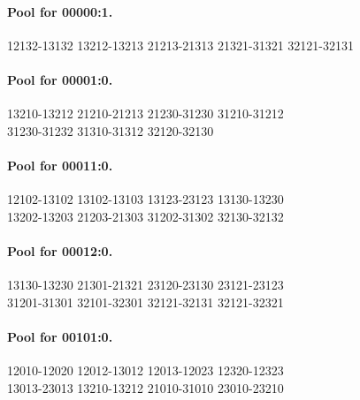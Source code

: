 \documentclass[11pt]{article}
\theoremstyle{remark}
\numberwithin{equation}{section}
\numberwithin{table}{section}
\begin{document}
\paragraph{Pool for 00000:1.}
\begingroup\footnotesize\ttfamily\begin{flushleft}
12132-13132 13212-13213 21213-21313 21321-31321 32121-32131\\
\end{flushleft}\endgroup
\paragraph{Pool for 00001:0.}
\begingroup\footnotesize\ttfamily\begin{flushleft}
13210-13212 21210-21213 21230-31230 31210-31212\\
31230-31232 31310-31312 32120-32130\\
\end{flushleft}\endgroup
\paragraph{Pool for 00011:0.}
\begingroup\footnotesize\ttfamily\begin{flushleft}
12102-13102 13102-13103 13123-23123 13130-13230\\
13202-13203 21203-21303 31202-31302 32130-32132\\
\end{flushleft}\endgroup
\paragraph{Pool for 00012:0.}
\begingroup\footnotesize\ttfamily\begin{flushleft}
13130-13230 21301-21321 23120-23130 23121-23123\\
31201-31301 32101-32301 32121-32131 32121-32321\\
\end{flushleft}\endgroup
\paragraph{Pool for 00101:0.}
\begingroup\footnotesize\ttfamily\begin{flushleft}
12010-12020 12012-13012 12013-12023 12320-12323\\
13013-23013 13210-13212 21010-31010 23010-23210\\
\end{flushleft}\endgroup
\end{document}

